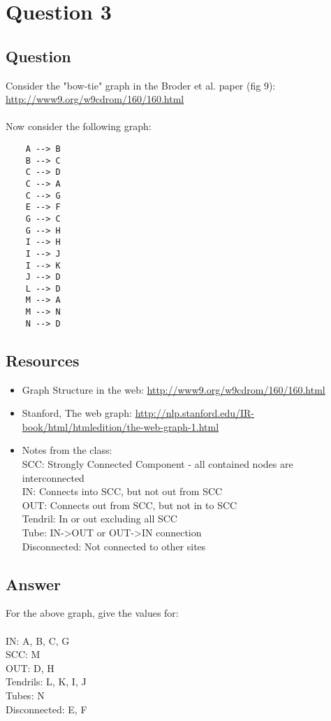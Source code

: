 \section{Question 3}

\subsection{Question}
Consider the "bow-tie" graph in the Broder et al. paper (fig 9): \url{http://www9.org/w9cdrom/160/160.html}\\\\
Now consider the following graph:
\begin{verbatim}
    A --> B
    B --> C
    C --> D
    C --> A
    C --> G
    E --> F
    G --> C
    G --> H
    I --> H
    I --> J
    I --> K
    J --> D 
    L --> D
    M --> A
    M --> N
    N --> D
\end{verbatim}

\subsection{Resources}
\begin{itemize}
\item Graph Structure in the web: \url{http://www9.org/w9cdrom/160/160.html}
\item Stanford, The web graph: \url{http://nlp.stanford.edu/IR-book/html/htmledition/the-web-graph-1.html}
\item Notes from the class:\\
SCC: Strongly Connected Component - all contained nodes are interconnected\\
IN: Connects into SCC, but not out from SCC\\
OUT: Connects out from SCC, but not in to SCC\\
Tendril: In or out excluding all SCC\\
Tube: IN->OUT or OUT->IN connection\\
Disconnected: Not connected to other sites\\
\end{itemize}

\subsection{Answer}
For the above graph, give the values for:\\\\
    IN: A, B, C, G\\
    SCC: M\\
    OUT: D, H\\
    Tendrils: L, K, I, J\\
    Tubes: N\\
    Disconnected: E, F\\